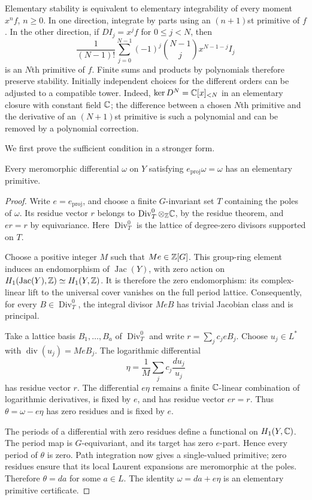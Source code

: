 Elementary stability is equivalent to elementary integrability of every
moment $x^n f$, $n\geq0$.  In one direction, integrate by parts using an
$(n+1)$st primitive of $f$.  In the other direction, if $DI_j=x^j f$ for
$0\leq j<N$, then
\[
 \frac1{(N-1)!}\sum_{j=0}^{N-1}
    (-1)^j\binom{N-1}{j}x^{N-1-j}I_j
\]
is an $N$th primitive of $f$.  Finite sums and products by polynomials
therefore preserve stability.  Initially independent choices for the
different orders can be adjusted to a compatible tower.  Indeed,
$\ker D^N=\mathbb C[x]_{<N}$ in an elementary closure with constant field $\mathbb C$;
the difference between a chosen $N$th primitive and the derivative of an
$(N+1)$st primitive is such a polynomial and can be removed by a
polynomial correction.

We first prove the sufficient condition in a stronger form.

\begin{lemma}
\label{lem:good-differential}
Every meromorphic differential $\omega$ on $Y$ satisfying
$e_{\mathrm{proj}}\omega=\omega$ has an elementary primitive.
\end{lemma}

\begin{proof}
Write $e=e_{\mathrm{proj}}$, and choose a finite $G$-invariant set $T$
containing the poles of $\omega$.  Its residue vector $r$ belongs to
$\operatorname{Div}^0_T\otimes_{\mathbb Z}\mathbb C$, by the residue theorem, and
$er=r$ by equivariance.  Here $\operatorname{Div}^0_T$ is the lattice of
degree-zero divisors supported on $T$.

Choose a positive integer $M$ such that $Me\in\mathbb Z[G]$.  This group-ring
element induces an endomorphism of $\operatorname{Jac}(Y)$, with zero
action on $H_1(\operatorname{Jac}(Y),\mathbb Z)\simeq H_1(Y,\mathbb Z)$.  It is
therefore the zero endomorphism: its complex-linear lift to the universal
cover vanishes on the full period lattice.  Consequently, for every
$B\in\operatorname{Div}^0_T$, the integral divisor $MeB$ has trivial
Jacobian class and is principal.

Take a lattice basis $B_1,\ldots,B_a$ of $\operatorname{Div}^0_T$ and
write $r=\sum_j c_j eB_j$.  Choose $u_j\in L^*$ with
$\operatorname{div}(u_j)=MeB_j$.  The logarithmic differential
\[
 \eta=\frac1M\sum_j c_j\frac{du_j}{u_j}
\]
has residue vector $r$.  The differential $e\eta$ remains a finite
$\mathbb C$-linear combination of logarithmic derivatives, is fixed by $e$, and
has residue vector $er=r$.  Thus $\theta=\omega-e\eta$ has zero
residues and is fixed by $e$.

The periods of a differential with zero residues define a functional on
$H_1(Y,\mathbb C)$.  The period map is $G$-equivariant, and its target has zero
$e$-part.  Hence every period of $\theta$ is zero.  Path integration now
gives a single-valued primitive; zero residues ensure that its local
Laurent expansions are meromorphic at the poles.  Therefore $\theta=da$
for some $a\in L$.  The identity $\omega=da+e\eta$ is an elementary
primitive certificate.
\end{proof}

